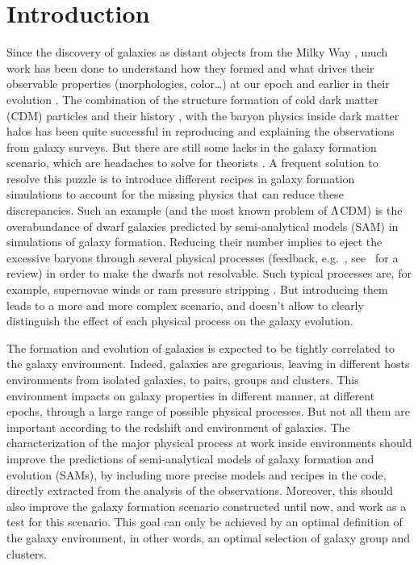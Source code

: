 \chapter{Introduction}

\minitoc%

Since the discovery of galaxies as distant objects from the Milky Way
\citep{Hubble+29}, much work has been done to understand how they formed and
what drives their observable properties (morphologies, color\ldots) at our
epoch and earlier in their evolution \citep{Benson+10,Silk+12,Silk+13}. The
combination of the structure formation of cold dark matter (CDM) particles and
their history \citep{Zentner+07}, with the baryon physics inside dark matter
halos \citep{Kravtsov+12} has been quite successful in reproducing and
explaining the observations from galaxy surveys. But there are still some lacks
in the galaxy formation scenario, which are headaches to solve for theorists
\citep{Weinmann+12}. A frequent solution to resolve this puzzle is to introduce
different recipes in galaxy formation simulations to account for the missing
physics that can reduce these discrepancies.
%
Such an example (and the most known problem of $\rm \Lambda$CDM) is the
overabundance of dwarf galaxies predicted by semi-analytical models (SAM) in
simulations of galaxy formation. Reducing their number implies to eject the
excessive baryons through several physical processes (feedback, e.g.\
\citet{Brooks+13}, see~\cite{Silk+12} for a review) in order to make the dwarfs
not resolvable. Such typical processes are, for example, supernovae winds
\citep{Hirschmann+13, Dekel+86} or ram pressure stripping \citep{Gunn+72}. But
introducing them leads to a more and more complex scenario, and doesn't allow
to clearly distinguish the effect of each physical process on the galaxy
evolution.

The formation and evolution of galaxies is expected to be tightly correlated to
the galaxy environment. Indeed, galaxies are gregarious, leaving in different
hosts environments from isolated galaxies, to pairs, groups and clusters. This
environment impacts on galaxy properties in different manner, at different
epochs, through a large range of possible physical processes. But not all them
are important according to the redshift and environment of galaxies. The
characterization of the major physical process at work inside environments
should improve the predictions of semi-analytical models of galaxy formation
and evolution (SAMs), by including more precise models and recipes in the code,
directly extracted from the analysis of the observations. Moreover, this should
also improve the galaxy formation scenario constructed until now, and work as a
test for this scenario. This goal can only be achieved by an optimal definition
of the galaxy environment, in other words, an optimal selection of galaxy group
and clusters.

